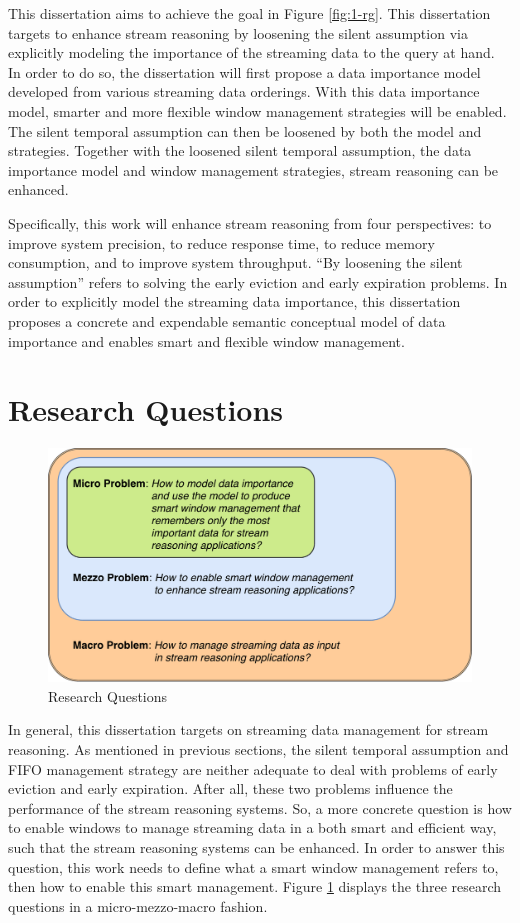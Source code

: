 This dissertation aims to achieve the goal in Figure \ref{fig:1-rg}.
This dissertation targets to enhance stream reasoning by loosening the silent assumption via explicitly modeling the importance of the streaming data to the query at hand.
In order to do so, the dissertation will first propose a data importance model developed from various streaming data orderings. 
With this data importance model, smarter and more flexible window management strategies will be enabled. 
The silent temporal assumption can then be loosened by both the model and strategies.
Together with the loosened silent temporal assumption, the data importance model and window management strategies, stream reasoning can be enhanced. 

Specifically, this work will enhance stream reasoning from four perspectives: to improve system precision, to reduce response time, to reduce memory consumption, and to improve system throughput. 
``By loosening the silent assumption'' refers to solving the early eviction and early expiration problems. 
In order to explicitly model the streaming data importance, this dissertation proposes a concrete and expendable semantic conceptual model of data importance and enables smart and flexible window management. 
%
\section{Research Questions}

\begin{figure}[!htbp]
	\centering
	\includegraphics[width=5in]{img/1-rq.pdf}
	\caption{Research Questions}
	\label{fig:1-rq} 
\end{figure}

In general, this dissertation targets on streaming data management for stream reasoning. 
As mentioned in previous sections, the silent temporal assumption and FIFO management strategy are neither adequate to deal with problems of early eviction and early expiration. 
After all, these two problems influence the performance of the stream reasoning systems. 
So, a more concrete question is how to enable windows to manage streaming data in a both smart and efficient way, such that the stream reasoning systems can be enhanced. 
In order to answer this question, this work needs to define what a smart window management refers to, then how to enable this smart management. 
Figure \ref{fig:1-rq} displays the three research questions in a micro-mezzo-macro \cite{lacasse2015making} fashion.

